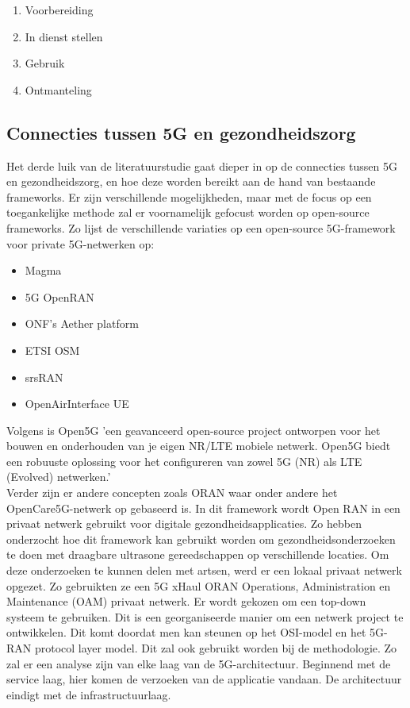 \begin{enumerate}
  \item Voorbereiding
  \item In dienst stellen
  \item Gebruik
  \item Ontmanteling
\end{enumerate}

\subsection{Connecties tussen 5G en gezondheidszorg}

Het derde luik van de literatuurstudie gaat dieper in op de connecties tussen 5G en gezondheidszorg, en hoe deze worden bereikt aan de hand van bestaande frameworks. Er zijn verschillende mogelijkheden, maar met de focus op een toegankelijke methode zal er voornamelijk gefocust worden op open-source frameworks. Zo lijst \textcite{Eswaran2022} de verschillende variaties op een open-source 5G-framework voor private 5G-netwerken op:

\begin{itemize}
  \item Magma
  \item 5G OpenRAN
  \item ONF's Aether platform
  \item ETSI OSM
  \item srsRAN
  \item OpenAirInterface UE
\end{itemize}

Volgens \textcite{Open5GS2024} is Open5G 'een geavanceerd open-source project ontworpen voor het bouwen en onderhouden van je eigen NR/LTE mobiele netwerk. Open5G biedt een robuuste oplossing voor het configureren van zowel 5G (NR) als LTE (Evolved) netwerken.' \\ Verder zijn er andere concepten zoals ORAN waar onder andere het OpenCare5G-netwerk op gebaseerd is. In dit framework wordt Open RAN in een privaat netwerk gebruikt voor digitale gezondheidsapplicaties. Zo hebben \textcite{de2023opencare5g} onderzocht hoe dit framework kan gebruikt worden om gezondheidsonderzoeken te doen met draagbare ultrasone gereedschappen op verschillende locaties. Om deze onderzoeken te kunnen delen met artsen, werd er een lokaal privaat netwerk opgezet. Zo gebruikten ze een 5G xHaul ORAN Operations, Administration en Maintenance (OAM) privaat netwerk. Er wordt gekozen om een top-down systeem te gebruiken. Dit is een georganiseerde manier om een netwerk project te ontwikkelen. Dit komt doordat men kan steunen op het OSI-model en het 5G-RAN protocol layer model. Dit zal ook gebruikt worden bij de methodologie. Zo zal er een analyse zijn van elke laag van de 5G-architectuur. Beginnend met de service laag, hier komen de verzoeken van de applicatie vandaan. De architectuur eindigt met de infrastructuurlaag. \autocite{de2023opencare5g}


